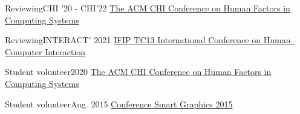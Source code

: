 
\resumeSubHeadingListStartNoLabel
\resumeSubheading
{Reviewing}{CHI '20 - CHI'22}
{\href{https://sigchi.org/}{The ACM CHI Conference on Human Factors in Computing Systems}}{}

\resumeSubheading
{Reviewing}{INTERACT' 2021}
{\href{https://www.interact2021.org/}{IFIP TC13 International Conference on Human–Computer Interaction}}{}

\resumeSubheading
{Student volunteer}{2020}
{\href{https://sigchi.org/}{The ACM CHI Conference on Human Factors in Computing Systems}}{}

\resumeSubheading
{Student volunteer}{Aug. 2015}
{\href{http://www.smartgraphics.org/sg15/}{Conference Smart Graphics 2015}}{}



\resumeSubHeadingListEnd